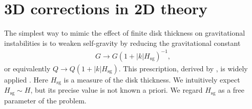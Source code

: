 


\section{3D corrections in 2D theory}\label{3dcorr}
The simplest way to mimic the effect of finite disk thickness
on gravitational instabilities is to weaken self-gravity by reducing 
the gravitational constant  
\begin{align}
  G \to G\left(1+|k|H_\mathrm{sg}\right)^{-1}, 
\end{align}
or equivalently $Q\to Q\left(1+|k|H_\mathrm{sg}\right)$. This
prescription, derived by \cite{shu84}, is widely applied
\citep[e.g.][]{youdin11,takahashi14}. Here $H_\mathrm{sg}$ is a
measure of the disk thickness. We intuitively expect
$H_\mathrm{sg}\sim H$, but its precise value is not known a priori.   
We regard $H_\mathrm{sg}$ as a free parameter of the problem.    


